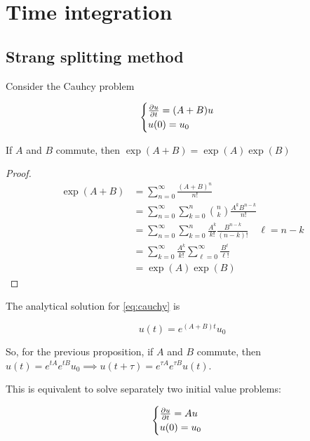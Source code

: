 \section{Time integration}

\subsection{Strang splitting method}

Consider the Cauhcy problem

\begin{equation}
    \begin{cases}
        \frac{\partial u}{\partial t} = (A + B) u \\
        u(0) = u_0
    \end{cases}
    \label{eq:cauchy}
\end{equation}

\begin{proposition}
    If $A$ and $B$ commute, then $\exp(A+B) = \exp(A)\exp(B)$
\end{proposition}

\begin{proof}
    
    \begin{align*}
        \exp(A + B) &= \sum_{n = 0}^\infty \frac{(A + B)^n}{n!} \\
                    &= \sum_{n = 0}^\infty \sum_{k = 0}^n \binom{n}{k} \frac{A^k B^{n-k}}{n!} \\
                    &= \sum_{n = 0}^\infty \sum_{k = 0}^n \frac{A^k}{k!} \frac{B^{n - k}}{(n - k)!}  \quad \ell = n - k \\
                    &= \sum_{k = 0}^\infty \frac{A^k}{k!} \sum_{\ell = 0}^\infty \frac{B^\ell}{\ell!} \\
                    &= \exp(A)\exp(B)
    \end{align*}

\end{proof}

The analytical solution for \ref{eq:cauchy} is

\[ u(t) = e^{(A + B)t} u_0 \]

So, for the previous proposition, if $A$ and $B$ commute, then $u(t) = e^{tA}e^{tB}u_0 \implies u(t + \tau) = e^{\tau A}e^{\tau B}u(t)$.

This is equivalent to solve separately two initial value problems:

\[
    \begin{cases}
        \frac{\partial u}{\partial t} = A u \\
        u(0) = u_0
    \end{cases}
    \label{eq:subproblemA}
\]

